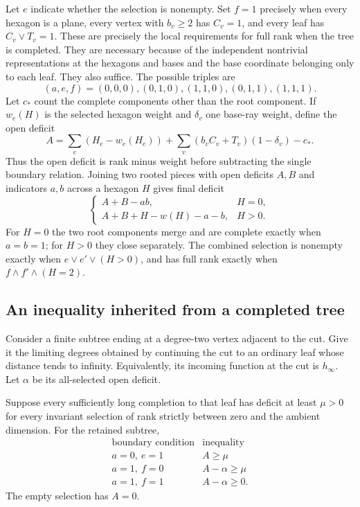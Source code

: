 Let $e$ indicate whether the selection is nonempty. Set $f=1$ precisely when
every hexagon is a plane, every vertex with $b_v\ge2$ has $C_v=1$,
and every leaf has $C_v\lor T_v=1$. These are precisely the local
requirements for full rank when the tree is completed. They are necessary
because of the independent nontrivial representations at the hexagons
and bases and the base coordinate belonging only to each leaf. They
also suffice.
The possible triples are
\[
 (a,e,f)=(0,0,0),(0,1,0),(1,1,0),(0,1,1),(1,1,1).
\]
Let $c_*$ count the complete components other than the root component.
If $w_e(H)$ is the selected hexagon weight and $\delta_v$ one base-ray
weight, define the open deficit
\[
 A=\sum_e(H_e-w_e(H_e))
    +\sum_v(b_vC_v+T_v)(1-\delta_v)-c_*.
\]
Thus the open deficit is rank minus weight before subtracting the
single boundary relation.
Joining two rooted pieces with open deficits $A,B$ and indicators $a,b$
across a hexagon $H$ gives final deficit
\begin{equation}\label{tree:join}
 \begin{cases}
 A+B-ab,&H=0,\\
 A+B+H-w(H)-a-b,&H>0.
 \end{cases}
\end{equation}
For $H=0$ the two root components merge and are complete exactly when
$a=b=1$; for $H>0$ they close separately. The combined selection is
nonempty exactly when $e\lor e'\lor(H>0)$, and has full rank exactly
when $f\land f'\land(H=2)$.

\subsection{An inequality inherited from a completed tree}
Consider a finite subtree ending at a degree-two vertex adjacent to the
cut. Give it the limiting degrees obtained by continuing the cut to an
ordinary leaf whose distance tends to infinity. Equivalently, its incoming
function at the cut is $h_\infty$. Let $\alpha$ be its all-selected
open deficit.

\begin{lemma}\label{tree:inherit}
Suppose every sufficiently long completion to that leaf has deficit
at least $\mu>0$ for every invariant selection of rank strictly between
zero and the ambient dimension. For the retained subtree,
\[
\begin{array}{c|c}
\text{boundary condition}&\text{inequality}\\ \hline
a=0,\ e=1&A\ge\mu\\
a=1,\ f=0&A-\alpha\ge\mu\\
a=1,\ f=1&A-\alpha\ge0.
\end{array}
\]
The empty selection has $A=0$.
\end{lemma}

